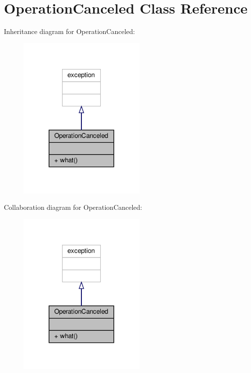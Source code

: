 \hypertarget{classOperationCanceled}{}\section{Operation\+Canceled Class Reference}
\label{classOperationCanceled}


Inheritance diagram for Operation\+Canceled\+:\nopagebreak
\begin{figure}[H]
\begin{center}
\leavevmode
\includegraphics[width=180pt]{classOperationCanceled__inherit__graph}
\end{center}
\end{figure}


Collaboration diagram for Operation\+Canceled\+:\nopagebreak
\begin{figure}[H]
\begin{center}
\leavevmode
\includegraphics[width=180pt]{classOperationCanceled__coll__graph}
\end{center}
\end{figure}
